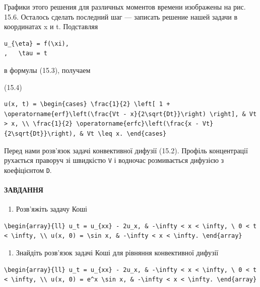 \documentclass[
  ukrainian,
]{article}
\providecommand{\tightlist}{%
  \setlength{\itemsep}{0pt}\setlength{\parskip}{0pt}}
\begin{document}
Графики этого решения для различных моментов времени изображены на рис.
15.6. Осталось сделать последний шаг --- записать решение нашей задачи в
координатах x и t. Подставляя

\begin{verbatim}
u_{\eta} = f(\xi),
,   \tau = t
\end{verbatim}

в формулы (15.3), получаем

(15.4)

\begin{verbatim}
u(x, t) = \begin{cases} \frac{1}{2} \left[ 1 + \operatorname{erf}\left(\frac{Vt - x}{2\sqrt{Dt}}\right) \right], & Vt > x, \\ \frac{1}{2} \operatorname{erfc}\left(\frac{x - Vt}{2\sqrt{Dt}}\right), & Vt \leq x. \end{cases}
\end{verbatim}

Перед нами розв'язок задачі конвективної дифузії (15.2). Профіль
концентрації рухається праворуч зі швидкістю \texttt{V} і водночас
розмивається дифузією з коефіцієнтом \texttt{D}.

\paragraph{ЗАВДАННЯ}\label{ux437ux430ux432ux434ux430ux43dux43dux44f-1}

\begin{enumerate}
\def\labelenumi{\arabic{enumi}.}
\tightlist
\item
  Розв'яжіть задачу Коші
\end{enumerate}

\begin{verbatim}
\begin{array}{ll} u_t = u_{xx} - 2u_x, & -\infty < x < \infty, \ 0 < t < \infty, \\ u(x, 0) = \sin x, & -\infty < x < \infty. \end{array}
\end{verbatim}

\begin{enumerate}
\def\labelenumi{\arabic{enumi}.}
\setcounter{enumi}{1}
\tightlist
\item
  Знайдіть розв'язок задачі Коші для рівняння конвективної дифузії
\end{enumerate}

\begin{verbatim}
\begin{array}{ll} u_t = u_{xx} - 2u_x, & -\infty < x < \infty, \ 0 < t < \infty, \\ u(x, 0) = e^x \sin x, & -\infty < x < \infty. \end{array}
\end{verbatim}
\end{document}
